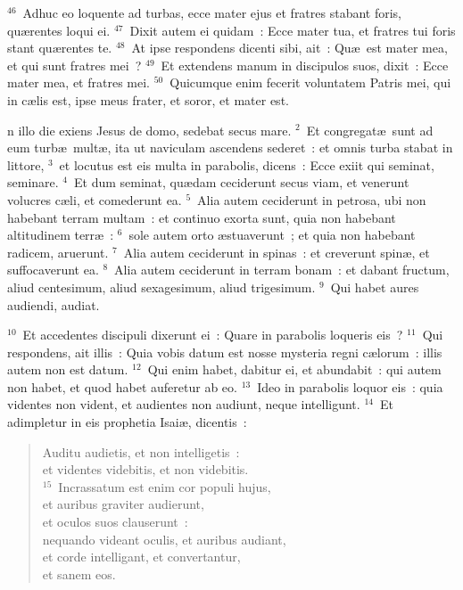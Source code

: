 ${}^{46}$~Adhuc eo loquente ad turbas, ecce mater ejus et fratres stabant foris, qu\ae rentes loqui ei.
${}^{47}$~Dixit autem ei quidam~: Ecce mater tua, et fratres tui foris stant qu\ae rentes te.
${}^{48}$~At ipse respondens dicenti sibi, ait~: Qu\ae\ est mater mea, et qui sunt fratres mei~?
${}^{49}$~Et extendens manum in discipulos suos, dixit~: Ecce mater mea, et fratres mei.
${}^{50}$~Quicumque enim fecerit voluntatem Patris mei, qui in c\ae lis est, ipse meus frater, et soror, et mater est.

\bchapter
{}n illo die exiens Jesus de domo, sedebat secus mare.
${}^{2}$~Et congregat\ae\ sunt ad eum turb\ae\ mult\ae , ita ut naviculam ascendens sederet~: et omnis turba stabat in littore,
${}^{3}$~et locutus est eis multa in parabolis, dicens~: Ecce exiit qui seminat, seminare.
${}^{4}$~Et dum seminat, qu\ae dam ceciderunt secus viam, et venerunt volucres c\ae li, et comederunt ea.
${}^{5}$~Alia autem ceciderunt in petrosa, ubi non habebant terram multam~: et continuo exorta sunt, quia non habebant altitudinem terr\ae~:
${}^{6}$~sole autem orto \ae stuaverunt~; et quia non habebant radicem, aruerunt.
${}^{7}$~Alia autem ceciderunt in spinas~: et creverunt spin\ae , et suffocaverunt ea.
${}^{8}$~Alia autem ceciderunt in terram bonam~: et dabant fructum, aliud centesimum, aliud sexagesimum, aliud trigesimum.
${}^{9}$~Qui habet aures audiendi, audiat.


${}^{10}$~Et accedentes discipuli dixerunt ei~: Quare in parabolis loqueris eis~?
${}^{11}$~Qui respondens, ait illis~: Quia vobis datum est nosse mysteria regni c\ae lorum~: illis autem non est datum.
${}^{12}$~Qui enim habet, dabitur ei, et abundabit~: qui autem non habet, et quod habet auferetur ab eo.
${}^{13}$~Ideo in parabolis loquor eis~: quia videntes non vident, et audientes non audiunt, neque intelligunt.
${}^{14}$~Et adimpletur in eis prophetia Isai\ae , dicentis~: \begin{flushleft}\begin{verse}Auditu audietis, et non intelligetis~:\\ et videntes videbitis, et non videbitis.\\
${}^{15}$~Incrassatum est enim cor populi hujus,\\ et auribus graviter audierunt,\\ et oculos suos clauserunt~:\\ nequando videant oculis, et auribus audiant,\\ et corde intelligant, et convertantur,\\ et sanem eos.\end{verse}\end{flushleft}


